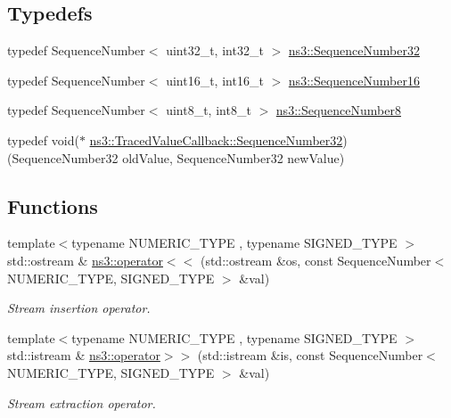\subsection*{Typedefs}
\begin{DoxyCompactItemize}
\item 
typedef Sequence\+Number$<$ uint32\+\_\+t, int32\+\_\+t $>$ \hyperlink{group__network_gacb2070e4e98d2d5135c9bede58f07a03}{ns3\+::\+Sequence\+Number32}
\item 
typedef Sequence\+Number$<$ uint16\+\_\+t, int16\+\_\+t $>$ \hyperlink{group__network_gaf266f5a4c5719a6897638f91ced3b5af}{ns3\+::\+Sequence\+Number16}
\item 
typedef Sequence\+Number$<$ uint8\+\_\+t, int8\+\_\+t $>$ \hyperlink{group__network_ga7897a211607bda13fb584aec87cf78fc}{ns3\+::\+Sequence\+Number8}
\item 
typedef void($\ast$ \hyperlink{group__network_ga27972028fff053ee0921314701d0df61}{ns3\+::\+Traced\+Value\+Callback\+::\+Sequence\+Number32}) (Sequence\+Number32 old\+Value, Sequence\+Number32 new\+Value)
\end{DoxyCompactItemize}
\subsection*{Functions}
\begin{DoxyCompactItemize}
\item 
{\footnotesize template$<$typename N\+U\+M\+E\+R\+I\+C\+\_\+\+T\+Y\+PE , typename S\+I\+G\+N\+E\+D\+\_\+\+T\+Y\+PE $>$ }\\std\+::ostream \& \hyperlink{namespacens3_a3a5a0f7cb9b9d94ff173bf660848e5de}{ns3\+::operator$<$$<$} (std\+::ostream \&os, const Sequence\+Number$<$ N\+U\+M\+E\+R\+I\+C\+\_\+\+T\+Y\+PE, S\+I\+G\+N\+E\+D\+\_\+\+T\+Y\+PE $>$ \&val)
\begin{DoxyCompactList}\small\item\em Stream insertion operator. \end{DoxyCompactList}\item 
{\footnotesize template$<$typename N\+U\+M\+E\+R\+I\+C\+\_\+\+T\+Y\+PE , typename S\+I\+G\+N\+E\+D\+\_\+\+T\+Y\+PE $>$ }\\std\+::istream \& \hyperlink{namespacens3_a97c27ec526d454a1b95d04d0075839ab}{ns3\+::operator$>$$>$} (std\+::istream \&is, const Sequence\+Number$<$ N\+U\+M\+E\+R\+I\+C\+\_\+\+T\+Y\+PE, S\+I\+G\+N\+E\+D\+\_\+\+T\+Y\+PE $>$ \&val)
\begin{DoxyCompactList}\small\item\em Stream extraction operator. \end{DoxyCompactList}\end{DoxyCompactItemize}
